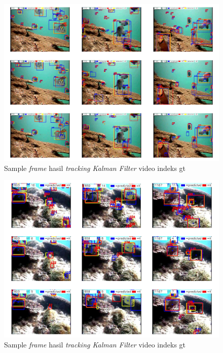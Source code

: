 	    \vspace{-0.25cm}
	    \begin{figure}[H]
	    	\centering
	    	\singlespacing
	    	\captionsetup{justification=centering,margin=0.5cm}
	    	\includegraphics[width=14.5cm]{image/gt_124/kf_results_gt_124.jpg}
	    	\caption{Sample \textit{frame} hasil \textit{tracking Kalman Filter} video indeks gt}
	    	\label{fig:kf_results_gt_124}
	    \end{figure}
    
	    \vspace{-0.5cm}
	    \begin{figure}[H]
	    	\centering
	    	\singlespacing
	    	\captionsetup{justification=centering,margin=0.5cm}
	    	\includegraphics[width=14.5cm]{image/gt_116/kf_results_gt_116.jpg}
	    	\caption{Sample \textit{frame} hasil \textit{tracking Kalman Filter} video indeks gt}
	    	\label{fig:kf_results_gt_116}
	    \end{figure}
    
